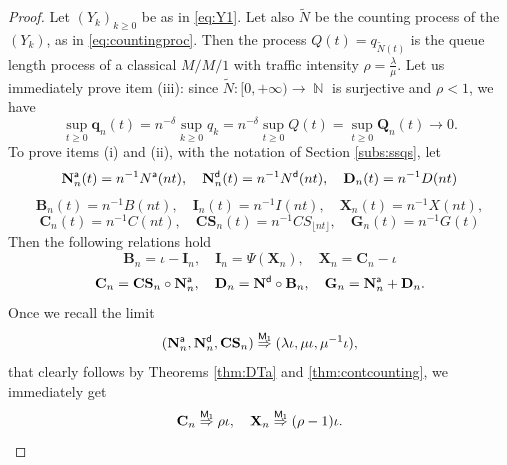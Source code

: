 \documentclass[]{amsart}
\numberwithin{equation}{section}
\theoremstyle{remark}
\theoremstyle{definition}
\DeclareMathOperator{\N}{\mathbb{N}}
\begin{document}
\begin{proof}
	Let $(Y_k)_{k \ge 0}$ be as in \eqref{eq:Y1}. Let also $\widetilde{N}$ be the counting process of the $(Y_k)$, as in \eqref{eq:countingproc}. Then the process $Q(t)=q_{\widetilde{N}(t)}$ is the queue length process of a classical $M/M/1$ with traffic intensity $\rho=\frac{\lambda}{\mu}$. Let us immediately prove item (iii): since $\widetilde{N}:[0,+\infty) \to \N$ is surjective and $\rho<1$, we have
	\begin{equation*}
		\sup_{t \ge 0}\mathbf{q}_n(t)=n^{-\delta}\sup_{k \ge 0}q_k=n^{-\delta}\sup_{t \ge 0}Q(t)=\sup_{t \ge 0}\mathbf{Q}_n(t) \to 0.
	\end{equation*}
	To prove items (i) and (ii), with the notation of Section \ref{subs:ssqs}, let
	\begin{equation*}
		\mathbf{N}_n^{\sf a}(t)=n^{-1}N^{\sf a}(nt), \quad \mathbf{N}_n^{\sf d}(t)=n^{-1}N^{\sf d}(nt), \quad \mathbf{D}_n(t)=n^{-1}D(nt)
	\end{equation*}
	\begin{equation*}
		\mathbf{B}_n(t)=n^{-1}B(nt), \quad \mathbf{I}_n(t)=n^{-1}I(nt), \quad \mathbf{X}_n(t)=n^{-1}X(nt),
	\end{equation*}
	\begin{equation*}
	\mathbf{C}_n(t)=n^{-1}C(nt), \quad \mathbf{CS}_n(t)=n^{-1}CS_{\lfloor nt \rfloor}, \quad  \mathbf{G}_n(t)=n^{-1}G(t)
	\end{equation*}
	Then the following relations hold
	\begin{equation*}
		\mathbf{B}_n=\iota-\mathbf{I}_n, \quad \mathbf{I}_n=\Psi(\mathbf{X}_n), \quad \mathbf{X}_n=\mathbf{C}_n-\iota
	\end{equation*}	
	\begin{equation*}
		\mathbf{C}_n=\mathbf{CS}_n \circ \mathbf{N}_n^{\sf a}, \quad \mathbf{D}_n=\mathbf{N}^{\sf d}\circ \mathbf{B}_n, \quad \mathbf{G}_n=\mathbf{N}^{\sf a}_n+\mathbf{D}_n.
	\end{equation*}
	Once we recall the limit
	\begin{equation*}
		(\mathbf{N}_n^{\sf a}, \mathbf{N}_n^{\sf d}, \mathbf{CS}_n) \overset{\sf M_1}{\Rightarrow} (\lambda \iota, \mu \iota, \mu^{-1}\iota),
	\end{equation*}
	that clearly follows by Theorems \ref{thm:DTa} and \ref{thm:contcounting}, we immediately get
	\begin{equation*}
		\mathbf{C}_n \overset{\sf M_1}{\Rightarrow} \rho \iota, \quad \mathbf{X}_n \overset{\sf M_1}{\Rightarrow} (\rho-1) \iota.
	\end{equation*}

\end{proof}
\end{document}

